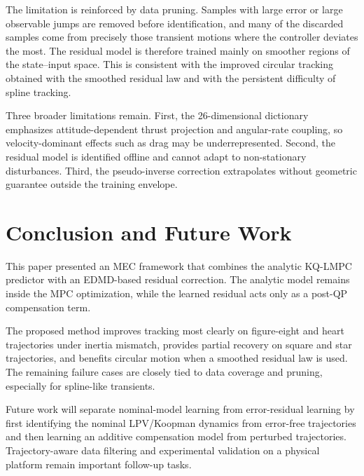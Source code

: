 \documentclass{article}
\begin{document}
The limitation is reinforced by data pruning. Samples with large error or large observable jumps are removed before identification, and many of the discarded samples come from precisely those transient motions where the controller deviates the most. The residual model is therefore trained mainly on smoother regions of the state--input space. This is consistent with the improved circular tracking obtained with the smoothed residual law and with the persistent difficulty of spline tracking.

Three broader limitations remain. First, the 26-dimensional dictionary emphasizes attitude-dependent thrust projection and angular-rate coupling, so velocity-dominant effects such as drag may be underrepresented. Second, the residual model is identified offline and cannot adapt to non-stationary disturbances. Third, the pseudo-inverse correction extrapolates without geometric guarantee outside the training envelope.

\section{Conclusion and Future Work}

This paper presented an MEC framework that combines the analytic KQ-LMPC predictor with an EDMD-based residual correction. The analytic model remains inside the MPC optimization, while the learned residual acts only as a post-QP compensation term.

The proposed method improves tracking most clearly on figure-eight and heart trajectories under inertia mismatch, provides partial recovery on square and star trajectories, and benefits circular motion when a smoothed residual law is used. The remaining failure cases are closely tied to data coverage and pruning, especially for spline-like transients.

Future work will separate nominal-model learning from error-residual learning by first identifying the nominal LPV/Koopman dynamics from error-free trajectories and then learning an additive compensation model from perturbed trajectories. Trajectory-aware data filtering and experimental validation on a physical platform remain important follow-up tasks.
\end{document}

